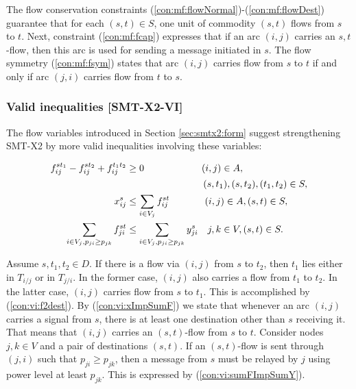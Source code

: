 The flow conservation constraints (\ref{con:mf:flowNormal})-(\ref{con:mf:flowDest}) guarantee that for each $(s,t)\in S$, one unit of commodity $(s,t)$ flows from $s$ to $t$. Next, constraint (\ref{con:mf:fcap}) expresses that if an arc $(i,j)$ carries an $s,t$-flow, then this arc is used for sending a message initiated in $s$. The flow symmetry (\ref{con:mf:fsym}) states that arc $(i,j)$ carries flow from $s$ to $t$ if and only if arc $(j,i)$ carries flow from $t$ to $s$.

\subsubsection{Valid inequalities [SMT-X2-VI]}

The flow variables introduced in Section \ref{sec:smtx2:form} suggest strengthening SMT-X2 by more valid inequalities involving these variables:

  \begin{subequations}[resume]
  \begin{flalign}
\label{con:vi:f2dest}  f^{st_1}_{ij}-f^{st_2}_{ij}+f^{t_1t_2}_{ij} & \geq 0 \quad\quad\quad\quad\quad\quad (i,j) \in A, \\  & \notag\quad\quad\quad\quad\quad\quad\quad\quad(s,t_1),(s,t_2),(t_1,t_2)\in S, \\
\label{con:vi:xImpSumF} x^{s}_{ij} & \leq \sum\limits_{i\in V_j}  f^{st}_{ij}   \quad\quad ~~~~~  (i,j)\in A, (s,t)\in S, \\
\label{con:vi:sumFImpSumY} \sum\limits_{i\in V_j, p_{ji}\geq p_{jk}}f^{st}_{ji} & \leq \sum\limits_{i\in V_j, p_{ji}\geq p_{jk}}  y^{s}_{ji} ~~~  j,k\in V, (s,t)\in S.
\end{flalign}
  \end{subequations}
  
Assume $s,t_1,t_2\in D$. If there is a flow via $(i,j)$ from $s$ to $t_2$, then $t_1$ lies either in $T_{i/j}$ or in $T_{j/i}$. In the former case, $(i,j)$ also carries a flow from $t_1$ to $t_2$. In the latter case, $(i,j)$ carries flow from $s$ to $t_1$. This is accomplished by (\ref{con:vi:f2dest}). By (\ref{con:vi:xImpSumF}) we state that whenever an arc $(i,j)$ carries a signal from $s$, there is at least one destination other than $s$ receiving it. That means that $(i,j)$ carries an $(s,t)$-flow from $s$ to $t$.  Consider nodes $j,k\in V$ and a pair of destinations $(s,t)$. If an $(s,t)$-flow is sent through $(j,i)$ such that $p_{ji}\geq p_{jk}$, then a message from $s$ must be relayed by $j$ using power level at least $p_{jk}$. This is expressed by (\ref{con:vi:sumFImpSumY}).
